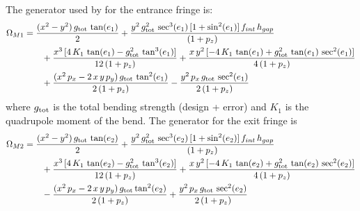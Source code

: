 The generator used by \bmad for the entrance fringe is:
\begin{align}
  \Omega_{M1} &= \frac{(x^2 - y^2) \, g_{\text{tot}} \, \tan (e_1)}{2} 
  + \frac{y^2 \, g_{\text{tot}}^2 \, \sec^3 (e_1) \, [1 + \sin^2 (e_1)] \, f_{int} \,  h_{gap}}{(1 + p_z)} \nonumber \\
  & \qquad + \frac{x^3 \, [4 \, K_1 \, \tan (e_1) - g_{\text{tot}}^2 \, \tan^3 (e_1)]}{12 \, (1 + p_z)}
  + \frac{x \, y^2 \, [-4 \, K_1 \, \tan (e_1) + g_{\text{tot}}^2 \, \tan (e_1) \, \sec^2 (e_1)]}{4 \, (1 + p_z)} \\
  &\qquad + \frac{(x^2 \, p_x - 2 \, x \, y \, p_y) \, g_{\text{tot}} \, \tan^2 (e_1)}{2 \, (1 + p_z)}
  - \frac{y^2 \, p_x \, g_{\text{tot}} \, \sec^2 (e_1)}{2 \, (1 + p_z)} \nonumber
\end{align}
where $g_{\text{tot}}$ is the total bending strength (design + error) and $K_1$ is the quadrupole moment of the bend.
The generator for the exit fringe is
\begin{align}
  \Omega_{M2} &= \frac{(x^2 - y^2) \, g_{\text{tot}} \, \tan (e_2)}{2} 
  + \frac{y^2 \, g_{\text{tot}}^2 \, \sec^3 (e_2) \, [1 + \sin^2 (e_2)] \, f_{int} \,  h_{gap}}{(1 + p_z)} \nonumber \\
  &\qquad + \frac{x^3 \, [4 \, K_1 \, \tan (e_2) - g_{\text{tot}}^2 \, \tan^3 (e_2)]}{12 \, (1 + p_z)}
  + \frac{x \, y^2 \, [-4 \, K_1 \, \tan (e_2) + g_{\text{tot}}^2 \, \tan (e_2) \, \sec^2 (e_2)]}{4 \, (1+p_z)} \\
  &\qquad - \frac{(x^2 \, p_x - 2 \, x \, y \, p_y) \, g_{\text{tot}} \tan^2 (e_2)}{2 \, (1 + p_z)}
  + \frac{y^2 \, p_x \, g_{\text{tot}} \, \sec^2 (e_2)}{2 \, (1 + p_z)} \nonumber
\end{align}

